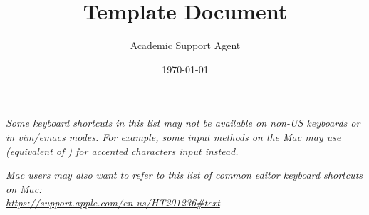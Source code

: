 \documentclass{article}
\title{Template Document}
\author{Academic Support Agent}
\date{\today}
\begin{document}
\maketitle

\maketitle

\emph{Some keyboard shortcuts in this list may not be available on non-US keyboards or in vim/emacs modes. For example, some input methods on the Mac may use \keys{\Alt} (equivalent of {\setmenukeyswin\keys{\Alt}}) for accented characters input instead.}

\emph{Mac users may also want to refer to this list of common editor keyboard shortcuts on Mac:\\ \url{https://support.apple.com/en-us/HT201236\#text}}

\bigskip
\end{document}
